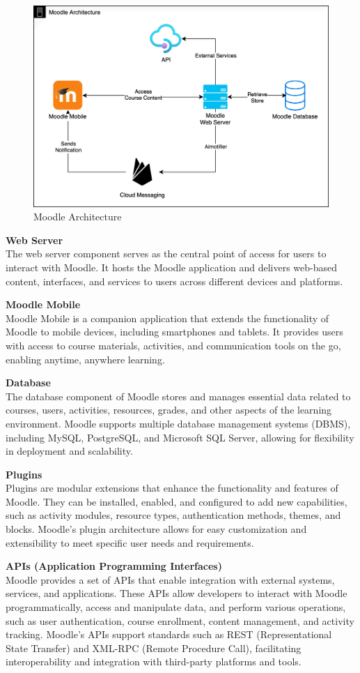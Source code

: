 \begin{figure}[h]
    \centering
    \includegraphics[width=0.75\linewidth]{assets/img/moodle-arch.jpg}
    \caption{Moodle Architecture}
    \label{fig:moodle-arch}
\end{figure}

\textbf{Web Server}\\
The web server component serves as the central point of access for users to interact with Moodle. It hosts the Moodle application and delivers web-based content, interfaces, and services to users across different devices and platforms.

\textbf{Moodle Mobile}\\
Moodle Mobile is a companion application that extends the functionality of Moodle to mobile devices, including smartphones and tablets. It provides users with access to course materials, activities, and communication tools on the go, enabling anytime, anywhere learning.

\textbf{Database}\\
The database component of Moodle stores and manages essential data related to courses, users, activities, resources, grades, and other aspects of the learning environment. Moodle supports multiple database management systems (DBMS), including MySQL, PostgreSQL, and Microsoft SQL Server, allowing for flexibility in deployment and scalability.

\textbf{Plugins}\\
Plugins are modular extensions that enhance the functionality and features of Moodle. They can be installed, enabled, and configured to add new capabilities, such as activity modules, resource types, authentication methods, themes, and blocks. Moodle's plugin architecture allows for easy customization and extensibility to meet specific user needs and requirements.

\textbf{APIs (Application Programming Interfaces)}\\
Moodle provides a set of APIs that enable integration with external systems, services, and applications. These APIs allow developers to interact with Moodle programmatically, access and manipulate data, and perform various operations, such as user authentication, course enrollment, content management, and activity tracking. Moodle's APIs support standards such as REST (Representational State Transfer) and XML-RPC (Remote Procedure Call), facilitating interoperability and integration with third-party platforms and tools.


